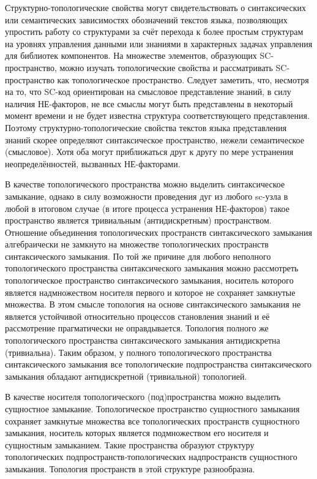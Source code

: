 Структурно-топологические свойства могут свидетельствовать о синтаксических или семантических зависимостях обозначений текстов языка, позволяющих упростить работу со структурами за счёт перехода к более простым структурам на уровнях управления данными или знаниями в характерных задачах управления для библиотек компонентов.
На множестве элементов, образующих SC-пространство, можно изучать топологические свойства и рассматривать SC-пространство как топологическое пространство. Следует заметить, что, несмотря на то, что SC-код ориентирован на смысловое представление знаний, в силу наличия НЕ-факторов, не все смыслы могут быть представлены в некоторый момент времени и не будет известна структура соответствующего представления. Поэтому структурно-топологические свойства текстов языка представления знаний скорее определяют синтаксическое пространство, нежели семантическое (смысловое). Хотя оба могут приближаться друг к другу по мере устранения неопределённостей, вызванных НЕ-факторами.

\begin{SCn}
\end{SCn}
В качестве топологического пространства можно выделить синтаксическое замыкание, однако в силу возможности проведения дуг из любого sc-узла в любой в итоговом случае (в итоге процесса устранения НЕ-факторов) такое пространство является тривиальным (антидискретным) пространством. Отношение объединения топологических пространств синтаксического замыкания алгебраически не замкнуто на множестве топологических пространств синтаксического замыкания. По той же причине для любого неполного топологического пространства синтаксического замыкания можно рассмотреть топологическое пространство синтаксического замыкания, носитель которого является надмножеством носителя первого и которое не сохраняет замкнутые множества. В этом смысле топология на основе синтаксического замыкания не является устойчивой относительно процессов становления знаний и её рассмотрение прагматически не оправдывается. Топология полного же топологического пространства синтаксического замыкания антидискретна (тривиальна). Таким образом, у полного топологического пространства синтаксического замыкания все топологические подпространства синтаксического замыкания обладают антидискретной (тривиальной) топологией.
\begin{SCn}
\end{SCn}
В качестве носителя топологического (под)пространства можно выделить сущностное замыкание. Топологическое пространство сущностного замыкания сохраняет замкнутые множества все топологических пространств сущностного замыкания, носитель которых является подмножеством его носителя и сущностным замыканием. Такие пространства образуют структуру топологических подпространств‑топологических надпространств сущностного замыкания. Топология пространств в этой структуре разнообразна.

